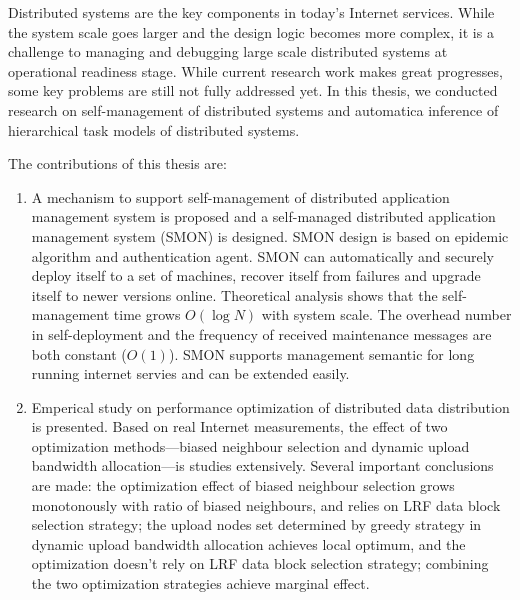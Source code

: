 \begin{eabstract}

  Distributed systems are the key components in today's Internet
  services. While the system scale goes larger and the design logic
  becomes more complex, it is a challenge to managing and debugging
  large scale distributed systems at operational readiness stage.
  While current research work makes great progresses, some key
  problems are still not fully addressed yet. In this thesis, we
  conducted research on self-management of distributed systems and
  automatica inference of hierarchical task models of distributed
  systems.

  The contributions of this thesis are:

  \begin{enumerate}

    \item A mechanism to support self-management of distributed
    application management system is proposed and a self-managed
    distributed application management system (SMON) is designed. SMON
    design is based on epidemic algorithm and authentication agent.
    SMON can automatically and securely deploy itself to a set of
    machines, recover itself from failures and upgrade itself to newer
    versions online. Theoretical analysis shows that the
    self-management time grows $O(\log N)$ with system scale. The
    overhead number in self-deployment and the frequency of received
    maintenance messages are both constant ($O(1)$).  SMON supports
    management semantic for long running internet servies and can be
    extended easily.

    \item Emperical study on performance optimization of distributed
    data distribution is presented. Based on real Internet
    measurements, the effect of two optimization methods---biased
    neighbour selection and dynamic upload bandwidth allocation---is
    studies extensively. Several important conclusions are made: the
    optimization effect of biased neighbour selection grows
    monotonously with ratio of biased neighbours, and relies on LRF data
    block selection strategy; the upload nodes set determined by
    greedy strategy in dynamic upload bandwidth allocation achieves
    local optimum, and the optimization doesn't rely on LRF data
    block selection strategy; combining the two optimization
    strategies achieve marginal effect.


\end{enumerate}
\end{eabstract}
